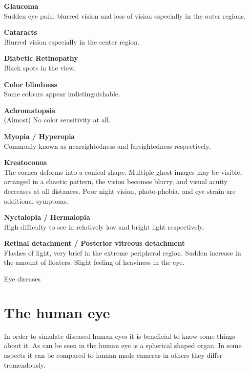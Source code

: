 \documentclass{acm_proc_article-sp}
\begin{document}
\begin{table}
    \textbf{Glaucoma}\\
    Sudden eye pain, blurred vision and loss of vision especially in the
    outer regions.

    \vspace{1em}\textbf{Cataracts}\\
    Blurred vision especially in the center region.

    \vspace{1em}\textbf{Diabetic Retinopathy}\\
    Black spots in the view.

    \vspace{1em}\textbf{Color blindness}\\
    Some colours appear indistinguishable.

    \vspace{1em}\textbf{Achromatopsia}\\
    (Almost) No color sensitivity at all.

    \vspace{1em}\textbf{Myopia / Hyperopia}\\
    Commonly known as nearsightedness and farsightedness respectively.

    \vspace{1em}\textbf{Kreatoconus}\\
    The cornea deforms into a conical shape.
    Multiple ghost images may be visible, arranged in a chaotic pattern,
    the vision becomes blurry, and visual acuity decreases at all distances.
    Poor night vision, photo-phobia, and eye strain are additional symptoms.

    \vspace{1em}\textbf{Nyctalopia / Hermalopia}\\
    High difficulty to see in relatively low and bright light respectively.

    \vspace{1em}\textbf{Retinal detachment / Posterior vitreous detachment}\\
    Flashes of light, very brief in the extreme peripheral region.
    Sudden increase in the amount of floaters.
    Slight feeling of heaviness in the eye.
    \caption{Eye diseases}
    \label{tab:eye_diseases}
\end{table}

\section{The human eye}
In order to simulate diseased human eyes it is beneficial to know some things about it.
As can be seen in  the human eye is a spherical shaped organ.
In some aspects it can be compared to human made cameras in others they differ tremendously.
\end{document}
